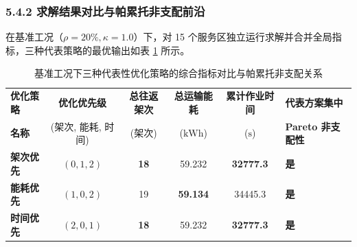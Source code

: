 \documentclass[withoutpreface,bwprint]{format}
\begin{document}
\subsubsection{5.4.2 求解结果对比与帕累托非支配前沿}
在基准工况（$\rho=20\%, \kappa=1.0$）下，对 15 个服务区独立运行求解并合并全局指标，三种代表策略的最优输出如表 \ref{tab:tradeoff} 所示。

\begin{table}[H]
\centering
\caption{基准工况下三种代表性优化策略的综合指标对比与帕累托非支配关系}
\label{tab:tradeoff}
\begin{tabularx}{\textwidth}{l c c c c >{\centering\arraybackslash}X}
\toprule
\textbf{优化策略} & \textbf{优化优先级} & \textbf{总往返架次} & \textbf{总运输能耗} & \textbf{累计作业时间} & \textbf{代表方案集中} \\
\textbf{名称} & (架次, 能耗, 时间) & (架次) & ($\text{kWh}$) & ($\text{s}$) & \textbf{Pareto 非支配性} \\
\midrule
\textbf{架次优先} & $(0, 1, 2)$ & \textbf{18} & 59.232 & \textbf{32777.3} & \textbf{是} \\
\textbf{能耗优先} & $(1, 0, 2)$ & 19 & \textbf{59.134} & 34445.3 & \textbf{是} \\
\textbf{时间优先} & $(2, 0, 1)$ & \textbf{18} & 59.232 & \textbf{32777.3} & \textbf{是} \\
\bottomrule
\end{tabularx}
\end{table}
\end{document}
